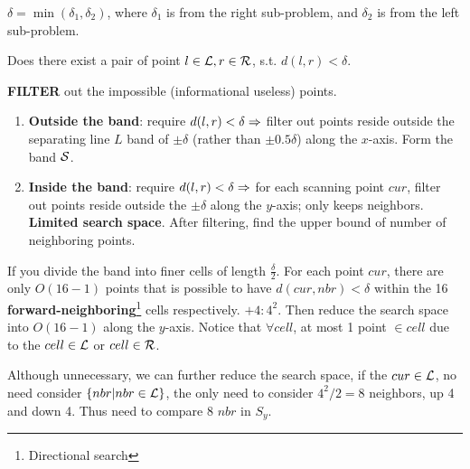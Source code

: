 \documentclass[a4paper]{report}
\theoremstyle{definition}
\begin{document}
$\delta = \min(\delta_1, \delta_2)$, where $\delta_1$ is from the right sub-problem, and $\delta_2$ is from the left sub-problem.

Does there exist a pair of point $l \in \mathcal{L}, r \in \mathcal{R}$, s.t. $d(l, r) <\delta$.

\textbf{FILTER} out the impossible (informational useless) points.
\begin{enumerate}
\item \textbf{Outside the band}: require $d(l, r)<\delta \Rightarrow$ filter out points reside outside the separating line $L$ band of $\pm\delta$ (rather than $\pm0.5\delta$) along the $x$-axis. Form the band $\mathcal{S}$.
\item \textbf{Inside the band}: require $d(l, r)<\delta \Rightarrow$ for each scanning point $cur$,  filter out points reside outside the $\pm\delta$ along the $y$-axis; only keeps neighbors. \textbf{Limited search space}. After filtering, find the upper bound of number of neighboring points.
\end{enumerate}

If you divide the band into finer cells of length $\frac{\delta}{2}$. For each point $cur$, there are only $O(16-1)$ points that is possible to have $d(cur, nbr)<\delta$ within the 16 \textbf{forward-neighboring}\footnote{Directional search} cells respectively. $+4: 4^2$. Then reduce the search space into $O(16-1)$ along the $y$-axis. Notice that $\forall cell$, at most 1 point $\in cell$ due to the $cell \in \mathcal{L}$ or $cell \in \mathcal{R}$.

Although unnecessary, we can further reduce the search space, if the $cur\in \mathcal{L}$, no need consider $\{nbr|nbr\in \mathcal{L}\}$, the only need to consider $4^2/2=8$ neighbors, up 4 and down 4. Thus need to compare 8 $nbr$ in $S_y$.
\end{document}

